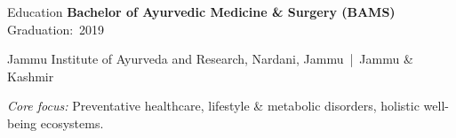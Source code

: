 \begin{rubric}{Education}
\entry*[]%
  \textbf{Bachelor of Ayurvedic Medicine \& Surgery (BAMS)} \hfill Graduation:~2019
  \par Jammu Institute of Ayurveda and Research, Nardani, Jammu~|~Jammu \& Kashmir
  \par \textit{Core focus:} Preventative healthcare, lifestyle \& metabolic disorders, holistic well-being ecosystems.
\end{rubric}